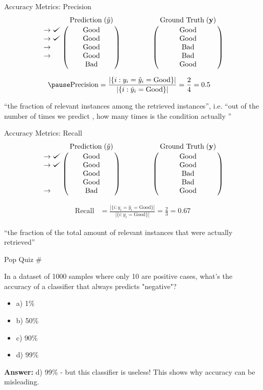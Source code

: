 \documentclass[usenames,dvipsnames]{beamer}
\begin{document}
\begin{frame}{Accuracy Metrics: Precision}
$$
\bordermatrix{&\text{Prediction}\;(\hat{y})\cr
               \rightarrow\checkmark&\text{Good}\cr
               \rightarrow\checkmark&\text{Good}\cr
                \rightarrow&\text{Good}\cr
                \rightarrow&\text{Good}\cr
               &\text{Bad}}
\qquad \qquad
\bordermatrix{&\text{Ground Truth}\;(\vy)\cr
                &\text{Good}\cr
                &\text{Good}\cr
                &\text{Bad}\cr
                &\text{Bad}\cr
                &\text{Good}}
$$

\begin{align*}
\pause \text{Precision} &= \frac{|\{i : y_i = \hat{y}_i = \text{Good}\}|}{|\{i : \hat{y}_i = \text{Good}\}|} = \frac{2}{4} = 0.5
\end{align*}

``the fraction of relevant instances among the retrieved instances'', i.e. ``out of the number of times we predict , how many times is the condition actually ''

\end{frame}

\begin{frame}{Accuracy Metrics: Recall}
$$
\bordermatrix{&\text{Prediction}\;(\hat{y})\cr
               \rightarrow\checkmark&\text{Good}\cr
               \rightarrow\checkmark&\text{Good}\cr
                &\text{Good}\cr
                &\text{Good}\cr
               \rightarrow&\text{Bad}}
\qquad \qquad
\bordermatrix{&\text{Ground Truth}\;(\vy)\cr
                &\text{Good}\cr
                &\text{Good}\cr
                &\text{Bad}\cr
                &\text{Bad}\cr
                &\text{Good}}
$$

\begin{align*}
\text{Recall} &= \frac{|\{i : y_i = \hat{y}_i = \text{Good}\}|}{|\{i : y_i = \text{Good}\}|} = \frac{2}{3} = 0.67
\end{align*}

``the fraction of the total amount of relevant instances that were actually retrieved''

\end{frame}

\begin{frame}{Pop Quiz \#\thepopquiz}
\begin{popquizbox}{\thepopquiz}
In a dataset of 1000 samples where only 10 are positive cases, what's the accuracy of a classifier that always predicts "negative"?
\begin{itemize}
	\item a) 1\%
	\item b) 50\% 
	\item c) 90\%
	\item d) 99\%
\end{itemize}
\pause
\textbf{Answer:} d) 99\% - but this classifier is useless! This shows why accuracy can be misleading.
\end{popquizbox}
\end{frame}
\end{document}
